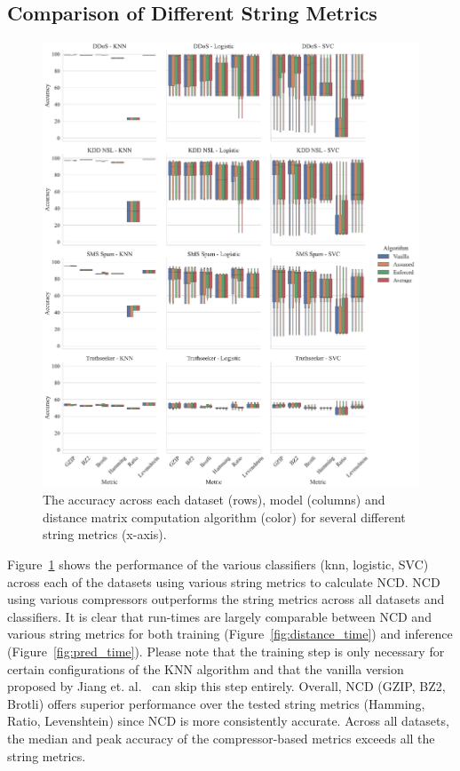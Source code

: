\documentclass[conference]{IEEEtran}
\begin{document}
\subsection{Comparison of Different String Metrics}


\begin{figure}[htb]
    \centering
    \includegraphics[width=\textwidth]{images/accuracy_vs_algorithm.pdf}
    \caption{The accuracy across each dataset (rows), model (columns) and distance matrix computation algorithm (color) for several different string metrics (x-axis).}
    \label{fig:metric_acc}
\end{figure}

Figure~\ref{fig:metric_acc} shows the performance of the various classifiers (knn, logistic, SVC) across each of the datasets using various string metrics to calculate NCD. 
NCD using various compressors outperforms the string metrics across all datasets and classifiers. 
It is clear that run-times are largely comparable between NCD and various string metrics for both training (Figure~\ref{fig:distance_time}) and inference (Figure~\ref{fig:pred_time}). 
Please note that the training step is only necessary for certain configurations of the KNN algorithm and that the vanilla version proposed by Jiang et. al.~\cite{jiang2022less} can skip this step entirely. 
Overall, NCD (GZIP, BZ2, Brotli) offers superior performance over the tested string metrics (Hamming, Ratio, Levenshtein) since NCD is more consistently accurate. Across all datasets, the median and peak accuracy of the compressor-based metrics exceeds all the string metrics.
\end{document}
